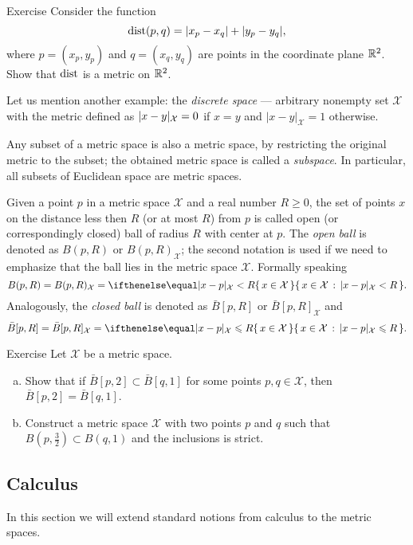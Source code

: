 \begin{thm}{Exercise}
Consider the function
$$\mathop{\rm dist}\nolimits(p,q)=|x_p-x_q|+|y_p-y_q|,$$
where $p=(x_p,y_p)$ and $q=(x_q,y_q)$ are points in the coordinate plane $\mathbb{R}^2$.
Show that $\mathop{\rm dist}\nolimits$ is a metric on $\mathbb{R}^2$.
\end{thm}

Let us mention another example: the \emph{discrete space} --- arbitrary nonempty set $\mathcal X$ with the metric defined as $|x\z-y|_{\mathcal X}=0$ if $x=y$ and $|x-y|_{\mathcal X}=1$ otherwise.

Any subset of a metric space is also a metric space, by restricting the original metric to the subset;
the obtained metric space is called a \emph{subspace}.
In particular, all subsets of Euclidean space are metric spaces.

Given a point $p$ in a metric space ${\mathcal X}$ and a real number $R\ge 0$, the set of points $x$ on the distance less then $R$ (or at most $R$) from $p$ is called open (or correspondingly closed) ball of radius $R$ with center at $p$.
The \emph{open ball} is denoted as $B(p,R)$ or $B(p,R)_{\mathcal X}$;
the second notation is used if we need to emphasize that the ball lies in the metric space $\mathcal X$.
Formally speaking
\[B(p,R)=B(p,R)_{\mathcal X}=\set{x\in \mathcal X}{|x-p|_{\mathcal X}< R}.\]
Analogously, the \emph{closed ball} is denoted as $\bar B[p,R]$ or $\bar B[p,R]_{\mathcal X}$ and
\[\bar B[p,R]=\bar B[p,R]_{\mathcal X}=\set{x\in \mathcal X}{|x-p|_{\mathcal X}\le R}.\]

\begin{thm}{Exercise}\label{ex:B2inB1}
Let $\mathcal X$ be a metric space.
\begin{enumerate}[(a)]
\item Show that if $\bar B[p,2]\subset \bar B[q,1]$
for some points $p,q\in \mathcal X$, then $\bar B[p,2]= \bar B[q,1]$.
\item Construct a metric space $\mathcal X$ with two points $p$ and $q$ such that
$B(p,\tfrac32)\subset B(q,1)$ and the inclusions is strict.
\end{enumerate}

\end{thm}



\subsection*{Calculus}

In this section we will extend standard notions from calculus to the metric spaces.

